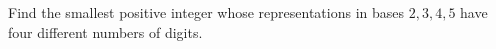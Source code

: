 Find the smallest positive integer whose representations in bases $2,3,4,5$ have four different numbers of digits.
